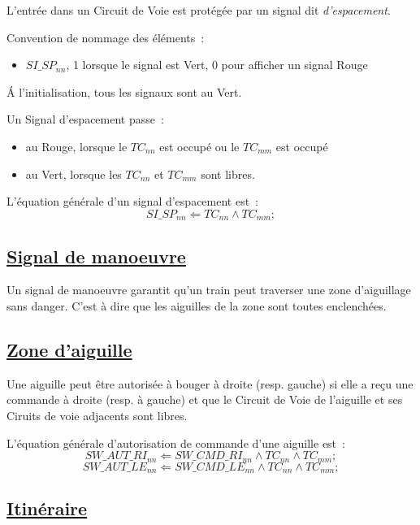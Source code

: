L'entrée dans un Circuit de Voie est protégée par un signal dit
\emph{d'espacement}.

Convention de nommage des éléments~:
\begin{itemize}
\item $SI\_SP_{nn}$, 1 lorsque le signal est Vert, 0 pour afficher un
  signal Rouge
\end{itemize}

\'A l'initialisation, tous les signaux sont au Vert.

Un Signal d'espacement passe~:
\begin{itemize}
\item au Rouge, lorsque le $TC_{nn}$ est occupé ou le $TC_{mm}$ est occupé
\item au Vert, lorsque les $TC_{nn}$ et $TC_{mm}$ sont libres.
\end{itemize}

\medskip
L'équation générale d'un signal d'espacement est~:
$$\boxed{
  SI\_SP_{nn} \Leftarrow TC_{nn} \land TC_{mm};
}$$


\subsection{\underline{Signal de manoeuvre}}
\label{sec:esp}

Un signal de manoeuvre garantit qu'un train peut traverser une zone
d'aiguillage sans danger. C'est à dire que les aiguilles de la zone
sont toutes enclenchées.




\subsection{\underline{Zone d'aiguille}}
\label{sec:aig}

Une aiguille peut être autorisée à bouger à droite (resp. gauche) 
si elle a reçu une commande à droite (resp. à gauche) et que le 
Circuit de Voie de l'aiguille et ses Ciruits de voie adjacents
sont libres. 

\medskip
L'équation générale d'autorisation de commande d'une aiguille est~:
$$\boxed{
  SW\_AUT\_RI_{nn} \Leftarrow SW\_CMD\_RI_{nn} \land TC_{nn} \land
  TC_{mm} ;
}$$
$$\boxed{
  SW\_AUT\_LE_{nn} \Leftarrow SW\_CMD\_LE_{nn} \land TC_{nn} \land TC_{mm} ;
}$$


\subsection{\underline{Itinéraire}}
\label{sec:iti}

